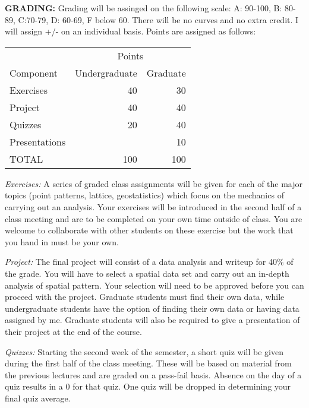 \documentclass{article} %
\begin{document}
\vspace{.2in}


{\bf GRADING:}  Grading will be assinged on the following scale: A: 90-100, B:
80-89, C:70-79, D: 60-69, F below 60. There will be no curves and no extra
credit. I will assign +/- on an individual basis. Points are assigned as
follows:

\vspace{.1in}
\begin{center}
\begin{tabular}[h]{|l|rr|}
  \hline
  &\multicolumn{2}{|c|}{Points}\\
  Component&Undergraduate&Graduate\\
  \hline
  Exercises&40&30\\
  Project&40&40\\
  Quizzes&20&40\\
  Presentations& &10\\
  \hline
  TOTAL&100&100\\ \hline
\end{tabular}
\end{center}
\vspace{.1in}

{\em Exercises:} A series of graded class assignments will be given for each
of the major topics (point patterns, lattice, geostatistics) which focus on
the mechanics of carrying out an analysis.  Your exercises will be introduced
in the second half of a class meeting and are to be completed on your own time
outside of class. You are welcome to collaborate with other students on these
exercise but the work that you hand in must be your own. 


\vspace{.1in}

{\em Project:} The final project will consist of a data analysis and  writeup
for 40\% of the grade. You will have to select a spatial data set and carry
out an in-depth analysis of spatial pattern. Your selection will need to be
approved before you can proceed with the project. Graduate students must find
their own data, while undergraduate students have the option of finding their
own data or having data assigned by me. Graduate students will also be
required to give a presentation of their project at the end of the course.


\vspace{.1in}

{\em Quizzes:} Starting the second week of the semester, a short quiz will be
given during the first half of the class meeting. These will be based on material from the
previous lectures and are graded on a pass-fail basis. Absence on the day of a
quiz results in a 0 for that quiz. One quiz will be dropped in determining
your final quiz average.
\end{document}
